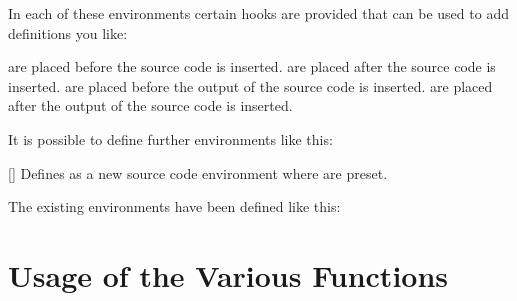 \documentclass[load-preamble+]{cnltx-doc}
\begin{document}
In each of these environments certain hooks are provided
that can be used to add definitions you like:
\begin{options}
     are placed before the source code is inserted.
     are placed after the source code is inserted.
     are placed before the output of the source code is
    inserted.
     are placed after the output of the source code is
    inserted.
\end{options}

It is possible to define further environments like this:
\begin{commands}
  []
    Defines  as a new source code environment where
     are preset.
\end{commands}

The existing environments have been defined like this:
\begin{sourcecode}
\end{sourcecode}

\section{Usage of the Various Functions}
\end{document}
